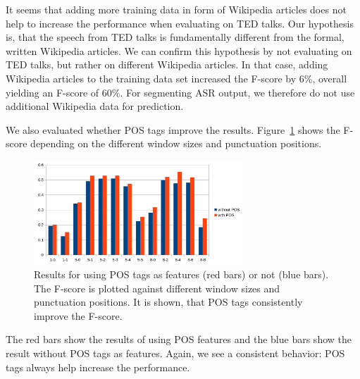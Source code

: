It seems that adding more training data in form of Wikipedia articles does not help to increase the performance when evaluating on TED talks.
Our hypothesis is, that the speech from TED talks is fundamentally different from the formal, written Wikipedia articles.
We can confirm this hypothesis by not evaluating on TED talks, but rather on different Wikipedia articles.
In that case, adding Wikipedia articles to the training data set increased the F-score by 6\%, overall yielding an F-score of 60\%.
For segmenting ASR output, we therefore do not use additional Wikipedia data for prediction.

We also evaluated whether POS tags improve the results.
Figure~\ref{fig:window_pos_eval} shows the F-score depending on the different window sizes and punctuation positions.
\begin{figure}[ht]
    \centering
    \includegraphics[width=0.7\textwidth]{img/window_pos_eval.png}
    \caption{Results for using POS tags as features (red bars) or not (blue bars). The F-score is plotted against different window sizes and punctuation positions. It is shown, that POS tags consistently improve the F-score.}
    \label{fig:window_pos_eval}
\end{figure}
The red bars show the results of using POS features and the blue bars show the result without POS tags as features.
Again, we see a consistent behavior: POS tags always help increase the performance.

